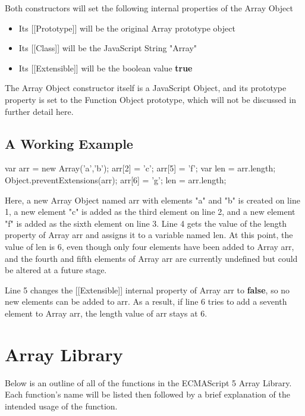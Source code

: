 \documentclass[a4paper,11pt,twoside]{report}
\begin{document}
Both constructors will set the following internal properties of the Array Object
\begin{itemize}
\item Its [[Prototype]] will be the original Array prototype object
\item Its [[Class]] will be the JavaScript String "Array"
\item Its [[Extensible]] will be the boolean value \textbf{true}
\end{itemize}

The Array Object constructor itself is a JavaScript Object, and its prototype property is set to the Function Object prototype, which will not be discussed in further detail here.

\section{A Working Example}
\begin{adjustwidth}{4cm}{4cm}
\begin{lstjs}
var arr = new Array('a','b');
arr[2] = 'c';
arr[5] = 'f';
var len = arr.length;
Object.preventExtensions(arr);
arr[6] = 'g';
len = arr.length;
\end{lstjs}
\end{adjustwidth}

Here, a new Array Object named arr with elements "a" and "b" is created on line 1, a new element "c" is added as the third element on line 2, and a new element "f" is added as the sixth element on line 3. Line 4 gets the value of the length property of Array arr and assigns it to a variable named len. At this point, the value of len is 6, even though only four elements have been added to Array arr, and the fourth and fifth elements of Array arr are currently undefined but could be altered at a future stage.

Line 5 changes the [[Extensible]] internal property of Array arr to \textbf{false}, so no new elements can be added to arr. As a result, if line 6 tries to add a seventh element to Array arr, the length value of arr stays at 6.


\chapter{Array Library}
Below is an outline of all of the functions in the ECMAScript 5 Array Library. Each function's name will be listed then followed by a brief explanation of the intended usage of the function.
\end{document}
